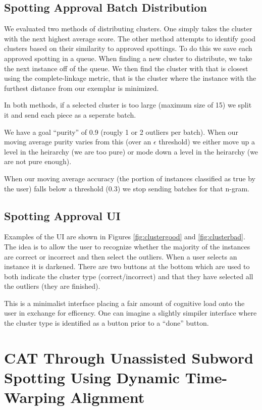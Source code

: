 \documentclass[ms,electronic,twosidetoc,letterpaper,chaptercenter,parttop,lof,lot]{byumsphd}
\begin{document}
\subsection{Spotting Approval Batch Distribution}

We evaluated two methods of distributing clusters.
One simply takes the cluster with the next highest average score.
The other method attempts to identify good clusters based on their similarity to approved spottings. To do this we save each approved spotting in a queue. When finding a new cluster to distribute, we take the next instance off of the queue. We then find the cluster with that is closest using the complete-linkage metric, that is the cluster where the instance with the furthest distance from our exemplar is minimized.

In both methods, if a selected cluster is too large (maximum size of 15) we split it and send each piece as a seperate batch.

We have a goal ``purity'' of 0.9 (rougly 1 or 2 outliers per batch). When our moving average purity varies from this (over an $\epsilon$ threshold) we either move up a level in the heirarchy (we are too pure) or mode down a level in the heirarchy (we are not pure enough).

When our moving average accuracy (the portion of instances classified as true by the user) falls below a threshold (0.3) we stop sending batches for that n-gram.

\subsection{Spotting Approval UI}

Examples of the UI are shown in Figures \ref{fig:clustergood} and \ref{fig:clusterbad}. The idea is to allow the user to recognize whether the majority of the instances are correct or incorrect and then select the outliers. When a user selects an instance it is darkened. There are two buttons at the bottom which are used to both indicate the cluster type (correct/incorrect) and that they have selected all the outliers (they are finished).

This is a minimalist interface placing a fair amount of cognitive load onto the user in exchange for efficency. One can imagine a slightly simpiler interface where the cluster type is identified as a button prior to a ``done'' button.



\section{CAT Through Unassisted Subword Spotting Using Dynamic Time-Warping Alignment} %
\end{document}
